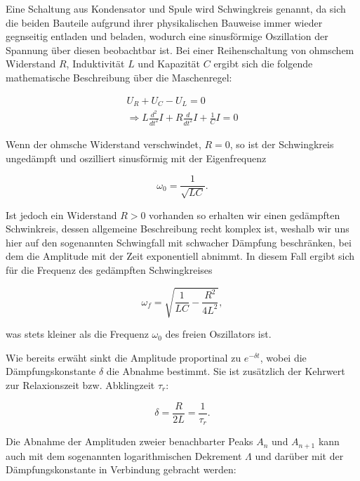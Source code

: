 \documentclass{article}
\begin{document}
Eine Schaltung aus Kondensator und Spule wird Schwingkreis genannt, da sich die beiden Bauteile aufgrund ihrer physikalischen Bauweise immer wieder gegnseitig entladen und beladen, wodurch eine sinusförmige Oszillation der Spannung über diesen beobachtbar ist. Bei einer Reihenschaltung von ohmschem Widerstand $R$, Induktivität $L$ und Kapazität $C$ ergibt sich die folgende mathematische Beschreibung über die Maschenregel:

\begin{equation}
    \begin{split}
        U_R + U_C - U_L = 0 \\
        \Rightarrow L \frac{d^2}{dt^2} I + R \frac{d}{dt^2} I + \frac{1}{C} I = 0
    \end{split}
\end{equation}

Wenn der ohmsche Widerstand verschwindet, $R=0$, so ist der Schwingkreis ungedämpft und oszilliert sinusförmig mit der Eigenfrequenz

\begin{equation}
    \omega_0 = \frac{1}{\sqrt{LC}}.
\end{equation}

Ist jedoch ein Widerstand $R > 0$ vorhanden so erhalten wir einen gedämpften Schwinkreis, dessen allgemeine Beschreibung recht komplex ist, weshalb wir uns hier auf den sogenannten Schwingfall mit schwacher Dämpfung beschränken, bei dem die Amplitude mit der Zeit exponentiell abnimmt. In diesem Fall ergibt sich für die Frequenz des gedämpften Schwingkreises

\begin{equation}
    \omega_f = \sqrt{\frac{1}{LC} - \frac{R^2}{4L^2}},
    \label{eq:GedämpfterSchwingkreis}
\end{equation}

was stets kleiner als die Frequenz $\omega_0$ des freien Oszillators ist. 

Wie bereits erwäht sinkt die Amplitude proportinal zu $e^{-\delta t}$, wobei die Dämpfungskonstante $\delta$ die Abnahme bestimmt. Sie ist zusätzlich der Kehrwert zur Relaxionszeit bzw. Abklingzeit $\tau_r$:

\begin{equation}
    \delta = \frac{R}{2L} = \frac{1}{\tau_r}  .
\end{equation}

Die Abnahme der Amplituden zweier benachbarter Peaks $A_n$ und $A_{n+1}$ kann auch mit dem sogenannten logarithmischen Dekrement $\Lambda$ und darüber mit der Dämpfungskonstante in Verbindung gebracht werden:
\end{document}
